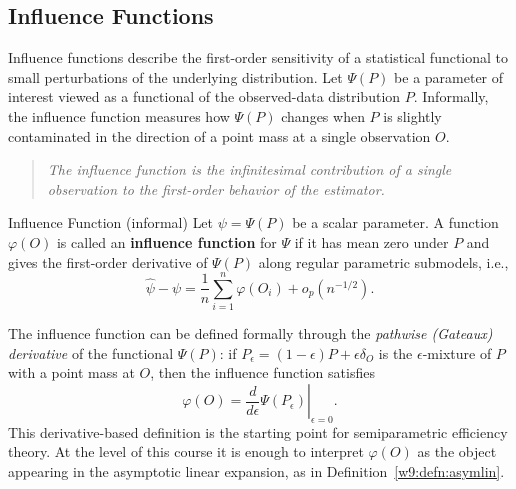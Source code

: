 \documentclass[master.tex]{subfiles}
\begin{document}
\subsection{Influence Functions}
\label{w9:subsec:if-def}

Influence functions describe the first-order sensitivity of a
statistical functional to small perturbations of the underlying
distribution.  Let $\Psi(P)$ be a parameter of interest viewed as a
functional of the observed-data distribution $P$.  Informally, the
influence function measures how $\Psi(P)$ changes when $P$ is slightly
contaminated in the direction of a point mass at a single observation
$O$.

\begin{quote}
\itshape
The influence function is the infinitesimal contribution of a single
observation to the first-order behavior of the estimator.
\end{quote}

\begin{defn}{Influence Function (informal)}
\label{w9:defn:if}
Let $\psi = \Psi(P)$ be a scalar parameter.  A function $\varphi(O)$
is called an \textbf{influence function} for $\Psi$ if it has mean zero
under $P$ and gives the first-order derivative of $\Psi(P)$ along
regular parametric submodels, i.e.,
\[
  \hat\psi - \psi
  =
  \frac{1}{n}\sum_{i=1}^n \varphi(O_i) + o_p(n^{-1/2}).
\]
\end{defn}

\begin{remark}
\label{w9:rem:pathwise}
The influence function can be defined formally through the
\emph{pathwise (Gateaux) derivative} of the functional $\Psi(P)$: if
$P_\epsilon = (1-\epsilon)P + \epsilon\delta_O$ is the $\epsilon$-mixture
of $P$ with a point mass at $O$, then the influence function satisfies
\[
  \varphi(O) = \left.\frac{d}{d\epsilon}\Psi(P_\epsilon)\right|_{\epsilon=0}.
\]
This derivative-based definition is the starting point for
semiparametric efficiency theory.  At the level of this course it is
enough to interpret $\varphi(O)$ as the object appearing in the
asymptotic linear expansion, as in Definition~\ref{w9:defn:asymlin}.
\end{remark}
\end{document}
